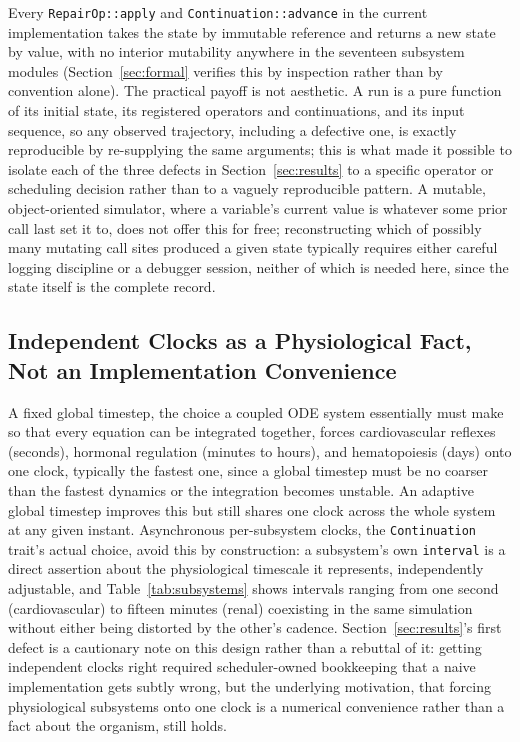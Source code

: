 \documentclass[11pt]{article}
\begin{document}
Every \texttt{RepairOp::apply} and \texttt{Continuation::advance} in the current implementation takes the state by immutable reference and returns a new state by value, with no interior mutability anywhere in the seventeen subsystem modules (Section~\ref{sec:formal} verifies this by inspection rather than by convention alone). The practical payoff is not aesthetic. A run is a pure function of its initial state, its registered operators and continuations, and its input sequence, so any observed trajectory, including a defective one, is exactly reproducible by re-supplying the same arguments; this is what made it possible to isolate each of the three defects in Section~\ref{sec:results} to a specific operator or scheduling decision rather than to a vaguely reproducible pattern. A mutable, object-oriented simulator, where a variable's current value is whatever some prior call last set it to, does not offer this for free; reconstructing which of possibly many mutating call sites produced a given state typically requires either careful logging discipline or a debugger session, neither of which is needed here, since the state itself is the complete record.

\subsection{Independent Clocks as a Physiological Fact, Not an Implementation Convenience}

A fixed global timestep, the choice a coupled ODE system essentially must make so that every equation can be integrated together, forces cardiovascular reflexes (seconds), hormonal regulation (minutes to hours), and hematopoiesis (days) onto one clock, typically the fastest one, since a global timestep must be no coarser than the fastest dynamics or the integration becomes unstable. An adaptive global timestep improves this but still shares one clock across the whole system at any given instant. Asynchronous per-subsystem clocks, the \texttt{Continuation} trait's actual choice, avoid this by construction: a subsystem's own \texttt{interval} is a direct assertion about the physiological timescale it represents, independently adjustable, and Table~\ref{tab:subsystems} shows intervals ranging from one second (cardiovascular) to fifteen minutes (renal) coexisting in the same simulation without either being distorted by the other's cadence. Section~\ref{sec:results}'s first defect is a cautionary note on this design rather than a rebuttal of it: getting independent clocks right required scheduler-owned bookkeeping that a naive implementation gets subtly wrong, but the underlying motivation, that forcing physiological subsystems onto one clock is a numerical convenience rather than a fact about the organism, still holds.
\end{document}
